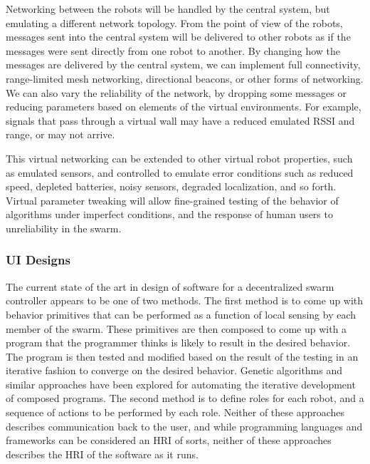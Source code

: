 \documentclass[]{article}
\begin{document}
Networking between the robots will be handled by the central system, but emulating a different network topology. 
From the point of view of the robots, messages sent into the central system will be delivered to other robots as if the messages were sent directly from one robot to another. 
By changing how the messages are delivered by the central system, we can implement full connectivity, range-limited mesh networking, directional beacons, or other forms of networking. 
We can also vary the reliability of the network, by dropping some messages or reducing parameters based on elements of the virtual environments. 
For example, signals that pass through a virtual wall may have a reduced emulated RSSI and range, or may not arrive. 

This virtual networking can be extended to other virtual robot properties, such as emulated sensors, and controlled to emulate error conditions such as reduced speed, depleted batteries, noisy sensors, degraded localization, and so forth.
Virtual parameter tweaking will allow fine-grained testing of the behavior of algorithms under imperfect conditions, and the response of human users to unreliability in the swarm. 

\subsubsection{UI Designs}

The current state of the art in design of software for a decentralized swarm controller appears to be one of two methods. 
The first method is to come up with behavior primitives that can be performed as a function of local sensing by each member of the swarm. 
These primitives are then composed to come up with a program that the programmer thinks is likely to result in the desired behavior. 
The program is then tested and modified based on the result of the testing in an iterative fashion to converge on the desired behavior. 
Genetic algorithms and similar approaches have been explored for automating the iterative development of composed programs. 
The second method is to define roles for each robot, and a sequence of actions to be performed by each role. 
Neither of these approaches describes communication back to the user, and while programming languages and frameworks can be considered an HRI of sorts, neither of these approaches describes the HRI of the software as it runs. 
\end{document}

